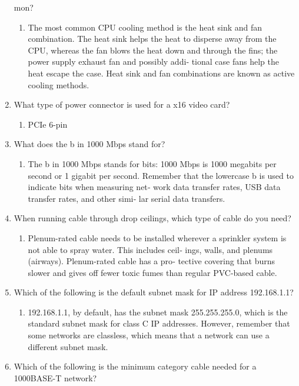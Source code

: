 \documentclass{article}
\begin{document}
\begin{enumerate}
mon?
    \begin{enumerate}
        \item The most common CPU cooling method is the heat
sink and fan combination. The heat sink helps the heat to disperse
away from the CPU, whereas the fan blows the heat down and
through the fins; the power supply exhaust fan and possibly addi‐
tional case fans help the heat escape the case. Heat sink and fan
combinations are known as active cooling methods.
    \end{enumerate}
    \item What type of power connector is used for a x16 video card?
    \begin{enumerate}
        \item PCIe 6-pin
    \end{enumerate}
    \item What does the b in 1000 Mbps stand for?
    \begin{enumerate}
        \item The b in 1000 Mbps stands for bits: 1000 Mbps is
1000 megabits per second or 1 gigabit per second. Remember
that the lowercase b is used to indicate bits when measuring net‐
work data transfer rates, USB data transfer rates, and other simi‐
lar serial data transfers.
    \end{enumerate}
    \item When running cable through drop ceilings, which type of cable do
you need?
    \begin{enumerate}
        \item Plenum-rated cable needs to be installed wherever
a sprinkler system is not able to spray water. This includes ceil‐
ings, walls, and plenums (airways). Plenum-rated cable has a pro‐
tective covering that burns slower and gives off fewer toxic
fumes than regular PVC-based cable.
    \end{enumerate}
    \item Which of the following is the default subnet mask for IP address
192.168.1.1?
    \begin{enumerate}
        \item 192.168.1.1, by default, has the subnet mask
255.255.255.0, which is the standard subnet mask for class C IP
addresses. However, remember that some networks are classless,
which means that a network can use a different subnet mask.
    \end{enumerate}
    \item Which of the following is the minimum category cable needed for
a 1000BASE-T network?

\end{enumerate}
\end{document}
